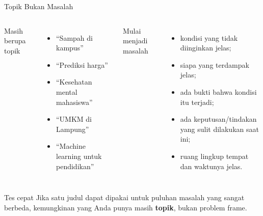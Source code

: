\documentclass[aspectratio=169,11pt]{beamer}
\begin{document}
\begin{frame}{Topik Bukan Masalah}
\begin{columns}[T]
\begin{alertblock}{Masih berupa topik}\end{alertblock}
\vspace{2mm}
\small
\begin{itemize}
  \item ``Sampah di kampus''
  \item ``Prediksi harga''
  \item ``Kesehatan mental mahasiswa''
  \item ``UMKM di Lampung''
  \item ``Machine learning untuk pendidikan''
\end{itemize}

\begin{block}{Mulai menjadi masalah}\end{block}
\vspace{2mm}
\small
\begin{itemize}
  \item kondisi yang tidak diinginkan jelas;
  \item siapa yang terdampak jelas;
  \item ada bukti bahwa kondisi itu terjadi;
  \item ada keputusan/tindakan yang sulit dilakukan saat ini;
  \item ruang lingkup tempat dan waktunya jelas.
\end{itemize}
\end{columns}

\begin{alertblock}{Tes cepat}
\footnotesize
Jika satu judul dapat dipakai untuk puluhan masalah yang sangat berbeda, kemungkinan yang Anda punya masih \textbf{topik}, bukan problem frame.
\end{alertblock}
\end{frame}
\end{document}
